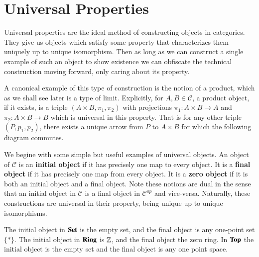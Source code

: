 \section{Universal Properties}

Universal properties are the ideal method of constructing objects in categories. They give us objects which satisfy some property that characterizes them uniquely up to unique isomorphism. Then as long as we can construct a single example of such an object to show existence we can obfiscate the technical construction moving forward, only caring about its property.

A canonical example of this type of construction is the notion of a product, which as we shall see later is a type of limit. Explicitly, for $A,B \in \mathscr{C}$, a product object, if it exists, is a triple $(A\times B,\pi_1,\pi_2)$ with projections $\pi_1:A\times B\rightarrow A$ and $\pi_2:A\times B\rightarrow B$ which is universal in this property. That is for any other triple $(P,p_1,p_2)$, there exists a unique arrow from $P$ to $A\times B$ for which the following diagram commutes.

\begin{center}
\end{center}

We begine with some simple but useful examples of universal objects. An object of $\mathscr{C}$ is an \textbf{initial object} if it has precisely one map to every object. It is a \textbf{final object} if it has precisely one map from every object. It is a \textbf{zero object} if it is both an initial object and a final object. Note these notions are dual in the sense that an initial object in $\mathscr{C}$ is a final object in $\mathscr{C}^{op}$ and vice-versa. Naturally, these constructions are universal in their property, being unique up to unique isomorphisms.

\begin{example}
    The initial object in $\normalfont\textbf{Set}$ is the empty set, and the final object is any one-point set $\{*\}$. The initial object in $\normalfont\textbf{Ring}$ is $\mathbb Z$, and the final object the zero ring. In $\normalfont\textbf{Top}$ the initial object is the empty set and the final object is any one point space.
\end{example}

